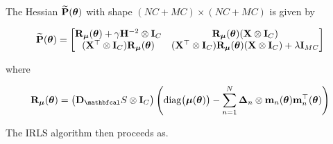 The Hessian $\widetilde{\mathbf{P}}(\boldsymbol{\theta})$ with shape $(NC + MC) \times (NC + MC)$  is given by


\begin{equation}
    \widetilde{\mathbf{P}}(\boldsymbol{\theta}) = \begin{bmatrix}
        \mathbf{R}_{\boldsymbol{\mu}}(\boldsymbol{\theta}) + \gamma \mathbf{H}^{-2} \otimes \mathbf{I}_C & \mathbf{R}_{\boldsymbol{\mu}}(\boldsymbol{\theta}) (\mathbf{X} \otimes \mathbf{I}_C) \\ 
        (\mathbf{X}^\top \otimes \mathbf{I}_C) \mathbf{R}_{\boldsymbol{\mu}}(\boldsymbol{\theta})  & (\mathbf{X}^\top \otimes \mathbf{I}_C) \mathbf{R}_{\boldsymbol{\mu}}(\boldsymbol{\theta}) (\mathbf{X} \otimes \mathbf{I}_C) + \lambda \mathbf{I}_{MC}
    \end{bmatrix}
\end{equation}

where 

\begin{equation}
    \RR_{\muu}(\thetaa) =  \big(\D_\St \otimes \I_C\big) \left(\Diag{\muu(\thetaa)} - \sum_{n=1}^N \mathbf{\Delta}_{n} \otimes \m_n (\thetaa) \m_n^\top(\thetaa) \right)
\end{equation}

The IRLS algorithm then proceeds as. 

